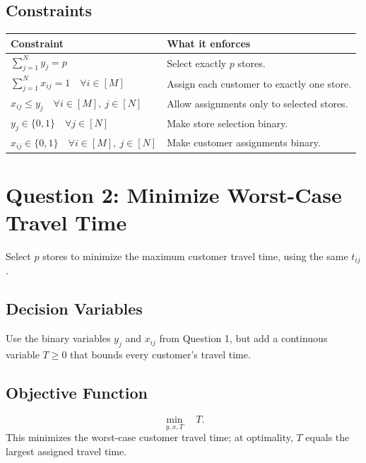 \documentclass{article}
\begin{document}
\subsection*{Constraints}
\begin{center}
\begin{tabular}{@{}p{}p{}@{}}
\toprule
\textbf{Constraint} & \textbf{What it enforces} \\
\midrule
$\sum_{j=1}^{N}y_j=p$ & Select exactly $p$ stores. \\[6pt]
$\sum_{j=1}^{N}x_{ij}=1\quad \forall i\in[M]$ & Assign each customer to exactly one store. \\[6pt]
$x_{ij}\le y_j\quad \forall i\in[M],\ j\in[N]$ & Allow assignments only to selected stores. \\[6pt]
$y_j\in\{0,1\}\quad \forall j\in[N]$ & Make store selection binary. \\[6pt]
$x_{ij}\in\{0,1\}\quad \forall i\in[M],\ j\in[N]$ & Make customer assignments binary. \\
\bottomrule
\end{tabular}
\end{center}

\section*{Question 2: Minimize Worst-Case Travel Time}

Select $p$ stores to minimize the maximum customer travel time, using the same $t_{ij}$.

\subsection*{Decision Variables}
Use the binary variables $y_j$ and $x_{ij}$ from Question 1, but add a continuous variable
$T\ge0$ that bounds every customer's travel time.

\subsection*{Objective Function}
\begin{equation}
\min_{y,x,T}\quad T.
\label{eq:max-obj}
\end{equation}
This minimizes the worst-case customer travel time; at optimality, $T$ equals the largest assigned travel time.
\end{document}
